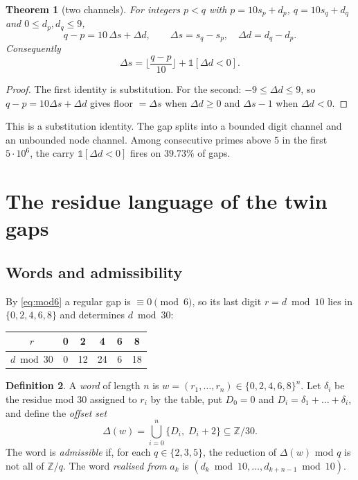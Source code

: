 \documentclass[11pt]{article}
\newcommand{\Z}{\mathbb Z}
\theoremstyle{plain}
\newtheorem{theorem}{Theorem}
\theoremstyle{definition}
\newtheorem{definition}[theorem]{Definition}
\theoremstyle{remark}
\begin{document}
\begin{theorem}[two channels]\label{thm:two}
For integers $p<q$ with $p=10s_p+d_p$, $q=10s_q+d_q$ and $0\le d_p,d_q\le 9$,
\[
q-p=10\,\Delta s+\Delta d,\qquad \Delta s=s_q-s_p,\quad \Delta d=d_q-d_p .
\]
Consequently
\[
\Delta s=\Big\lfloor \frac{q-p}{10}\Big\rfloor+\mathbb 1[\Delta d<0].
\]
\end{theorem}
\begin{proof}
The first identity is substitution. For the second: $-9\le\Delta d\le 9$, so
$q-p=10\Delta s+\Delta d$ gives floor $=\Delta s$ when $\Delta d\ge 0$ and $\Delta s-1$ when
$\Delta d<0$.
\end{proof}

\noindent
This is a substitution identity. The gap splits into a bounded digit channel and an unbounded node
channel. Among
consecutive primes above $5$ in the first $5\cdot10^6$, the carry $\mathbb 1[\Delta d<0]$ fires on
$39.73\%$ of gaps.

\section{The residue language of the twin gaps}

\subsection{Words and admissibility}

By \eqref{eq:mod6} a regular gap is $\equiv0\pmod 6$, so its last digit $r=d\bmod10$ lies in
$\{0,2,4,6,8\}$ and determines $d\bmod 30$:
\begin{center}
\begin{tabular}{@{}c|ccccc@{}}
$r$ & 0 & 2 & 4 & 6 & 8\\\hline
$d \bmod 30$ & 0 & 12 & 24 & 6 & 18
\end{tabular}
\end{center}

\begin{definition}\label{def:word}
A \emph{word} of length $n$ is $w=(r_1,\dots,r_n)\in\{0,2,4,6,8\}^n$. Let $\delta_i$ be the
residue mod $30$ assigned to $r_i$ by the table, put $D_0=0$ and $D_i=\delta_1+\dots+\delta_i$, and
define the \emph{offset set}
\[
\Delta(w)=\bigcup_{i=0}^{n}\{D_i,\;D_i+2\}\subseteq \Z/30 .
\]
The word is \emph{admissible} if, for each $q\in\{2,3,5\}$, the reduction of $\Delta(w)$ mod $q$ is
not all of $\Z/q$. The word \emph{realised from} $a_k$ is $(d_k\bmod10,\dots,d_{k+n-1}\bmod10)$.
\end{definition}
\end{document}
